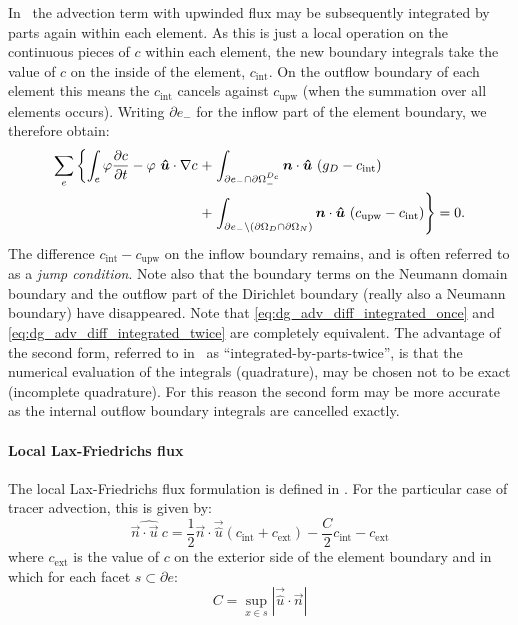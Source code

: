 In \fluidity\ the advection term with upwinded flux may be subsequently
integrated by parts again within each element. As this is just a local
operation on the continuous pieces of $c$ within each element, the new
boundary integrals take the value of $c$ on the inside of the element,
$c_{\mathrm{int}}$. On the outflow boundary of each element this means the
$c_{\mathrm{int}}$ cancels against $c_{\mathrm{upw}}$ (when the summation over all elements occurs).
Writing $\partial e_-$ for the inflow part of the element boundary, we therefore obtain:
\begin{equation}
\begin{split}
  \sum_e \left\{ \int_e \varphi \frac{\partial c}{\partial t}
  - \varphi~{\mbox{\boldmath$\hat u$}}\cdot\nabla c \right.
    +& \left. \int_{\partial e_- \cap\partial\Omega^{D_c}_-} {\mbox{\boldmath$n$}}\cdot{\mbox{\boldmath$\hat u$}}~(g_D -c_{\mathrm{int}}) \right. \\
    +& \left. \int_{\partial e_-\setminus (\partial\Omega_D\cap\partial\Omega_N)}
    {\mbox{\boldmath$n$}}\cdot{\mbox{\boldmath$\hat u$}}~
      (c_{\mathrm{upw}}-c_{\mathrm{int}}) \right\} =0.
    \label{eq:dg_adv_diff_integrated_twice}
\end{split}
\end{equation}
The difference $c_{\mathrm{int}}-c_{\mathrm{upw}}$ on the inflow boundary
remains, and is often referred to as a \emph{jump condition}. Note also that
the boundary terms on the Neumann domain boundary and the outflow part of
the Dirichlet boundary (really also a Neumann boundary) have disappeared.
Note that \eqref{eq:dg_adv_diff_integrated_once} and
\eqref{eq:dg_adv_diff_integrated_twice} are completely equivalent. The
advantage of the second form, referred to in \fluidity\ as
``integrated-by-parts-twice'', is that the numerical evaluation of the
integrals (quadrature), may be chosen not to be exact (incomplete quadrature). For this
reason the second form may be more accurate as the internal outflow boundary
integrals are cancelled exactly.

\paragraph{Local Lax-Friedrichs flux}

The local Lax-Friedrichs flux formulation is defined in
\citet[p208]{cockburn2001}. For the
particular case of tracer advection, this is given by:
\begin{equation}
  \widehat{\vec{n}\cdot\vec{u}~c}=\frac{1}{2}\vec{n}\cdot\vec{\hat u}
  \left(c_{\mathrm{int}}+c_{\mathrm{ext}}\right)
  -\frac{C}{2}c_{\mathrm{int}}-c_{\mathrm{ext}}
\end{equation}
where $c_{\mathrm{ext}}$ is the value of $c$ on the exterior side of the
  element boundary and in which for each facet $s\subset\partial e$:
\begin{equation}
  C= \sup_{x\in s}|\vec{\hat u}\cdot\vec{n}|
\end{equation}

